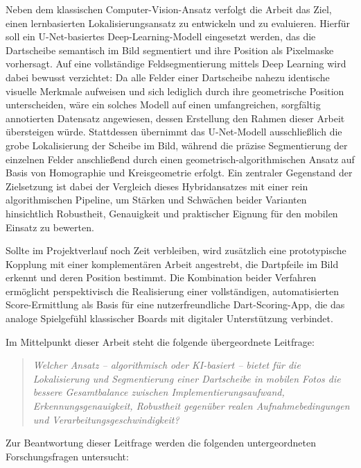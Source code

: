 Neben dem klassischen Computer-Vision-Ansatz verfolgt die Arbeit das Ziel, einen lernbasierten Lokalisierungsansatz zu entwickeln und zu evaluieren. Hierfür soll ein U-Net-basiertes Deep-Learning-Modell eingesetzt werden, das die Dartscheibe semantisch im Bild segmentiert und ihre Position als Pixelmaske vorhersagt. Auf eine vollständige Feldsegmentierung mittels Deep Learning wird dabei bewusst verzichtet: Da alle Felder einer Dartscheibe nahezu identische visuelle Merkmale aufweisen und sich lediglich durch ihre geometrische Position unterscheiden, wäre ein solches Modell auf einen umfangreichen, sorgfältig annotierten Datensatz angewiesen, dessen Erstellung den Rahmen dieser Arbeit übersteigen würde. Stattdessen übernimmt das U-Net-Modell ausschließlich die grobe Lokalisierung der Scheibe im Bild, während die präzise Segmentierung der einzelnen Felder anschließend durch einen geometrisch-algorithmischen Ansatz auf Basis von Homographie und Kreisgeometrie erfolgt. Ein zentraler Gegenstand der Zielsetzung ist dabei der Vergleich dieses Hybridansatzes mit einer rein algorithmischen Pipeline, um Stärken und Schwächen beider Varianten hinsichtlich Robustheit, Genauigkeit und praktischer Eignung für den mobilen Einsatz zu bewerten.

Sollte im Projektverlauf noch Zeit verbleiben, wird zusätzlich eine prototypische Kopplung mit einer komplementären Arbeit angestrebt, die Dartpfeile im Bild erkennt und deren Position bestimmt. Die Kombination beider Verfahren ermöglicht perspektivisch die Realisierung einer vollständigen, automatisierten Score-Ermittlung als Basis für eine nutzerfreundliche Dart-Scoring-App, die das analoge Spielgefühl klassischer Boards mit digitaler Unterstützung verbindet.

Im Mittelpunkt dieser Arbeit steht die folgende übergeordnete Leitfrage:

\begin{quote}
    \textit{Welcher Ansatz -- algorithmisch oder KI-basiert -- bietet für die
    Lokalisierung und Segmentierung einer Dartscheibe in mobilen Fotos die
    bessere Gesamtbalance zwischen Implementierungsaufwand, Erkennungsgenauigkeit,
    Robustheit gegenüber realen Aufnahmebedingungen und Verarbeitungsgeschwindigkeit?}
\end{quote}

\noindent
Zur Beantwortung dieser Leitfrage werden die folgenden untergeordneten
Forschungsfragen untersucht:

